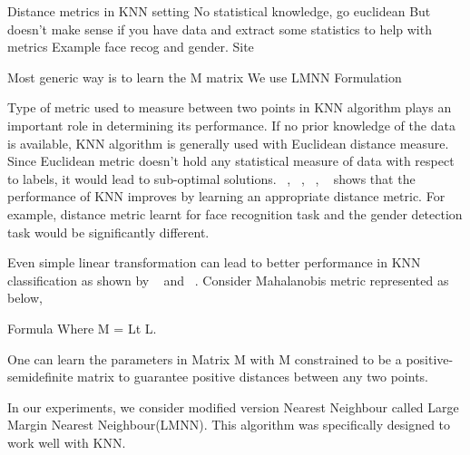 Distance metrics in KNN setting 
No statistical knowledge, go euclidean
But doesn't make sense if you have data and extract some statistics to help with metrics
Example face recog and gender. Site

Most generic way is to learn the M matrix
We use LMNN
Formulation

Type of metric used to measure between two points in KNN algorithm plays an important role 
in determining its performance. If no prior knowledge of the data is available, KNN algorithm
is generally used with Euclidean distance measure. Since Euclidean metric doesn't hold any
statistical measure of data with respect to labels, it would lead to sub-optimal solutions.
~\cite{Chopra:2005:LSM:1068507.1068961}, ~\cite{NIPS2004_2566}, ~\cite{Shalev-Shwartz:2004:OBL:1015330.1015376}, 
~\cite{Shental:2002:ALR:645318.649268} shows that the performance of KNN improves by 
learning an appropriate distance metric. For example, distance metric learnt for face recognition
task and the gender detection task would be significantly different.

Even simple linear transformation can lead to better performance in KNN classification as shown by 
~\cite{Shalev-Shwartz:2004:OBL:1015330.1015376} and ~\cite{NIPS2004_2566}. Consider Mahalanobis
metric represented as below,

Formula
Where M  = Lt L.

One can learn the parameters in Matrix M with M constrained to be a positive-semidefinite matrix to
guarantee positive distances between any two points.

In our experiments, we consider modified version Nearest Neighbour called Large Margin Nearest Neighbour(LMNN).
This algorithm was specifically designed to work well with KNN.
